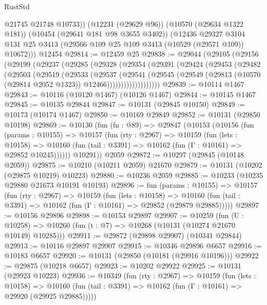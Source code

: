 \begin{lexlean}{RustStd}
\begin{coremodule}
          @21745
          @21748
          @10733))
      (@12231 (@29629 @96))
      (@10570 (@29634 @1322 @181))
      (@10454 (@29641 @181 @98 @3655 @3402))
      (@12436
        @29327
        @3104
        @131
        @25
        @3413
        (@29566 @109 @25 @109 @3413 (@10529 (@29571 @109)) @10672)))
    @12454
@29814 := @12459 @25
@29838 := @29044
    (@29105
      (@29156
        (@29199
          (@29237
            (@29285
              (@29328
                (@29354
                  (@29391
                    (@29424
                      (@29453
                        (@29482
                          (@29503
                            (@29519
                              (@29533
                                (@29537
                                  (@29541
                                    (@29545
                                      (@29549
                                        (@29813
                                          (@10570 (@29814 @2052 @1323))
                                          @12466)))))))))))))))))))
@29839 := @10114 @1467
@29843 := @10116 (@10120 @1467) (@10126 @1467)
@29844 := @10145 @1467
@29845 := @10135 @29844
@29847 := @10131 (@29845 @10150)
@29849 := @10173 (@10174 @1467)
@29850 := @10169 @29849
@29852 := @10131 (@29850 @10198)
@29869 := @10130
    (fun (fn : @89) =>
    @29847
      (@10153
        (@10156
          (fun (params : @10155) =>
          @10157
            (fun (rty : @2967) =>
            @10159
              (fun (lets : @10158) =>
              @10160 (fun (tail : @3391) => @10162 (fun (Γ : @10161) => @29852 @10245))))))
        @10291))
    @2059
@29872 := @10297 (@29845 (@10148 @2059))
@29875 := @10210 (@10211 @2059) @21670
@29879 := @10131 (@10202 (@29875 @10219) @10223)
@29880 := @10236 @2059
@29885 := @10233 (@10235 @29880 @21673 @10191 @10193)
@29896 := fun (params : @10155) =>
  @10157
    (fun (rty : @2967) =>
    @10159
      (fun (lets : @10158) =>
      @10160 (fun (tail : @3391) => @10162 (fun (Γ : @10161) => @29852 (@29879 @29885)))))
@29897 := @10156 @29896
@29898 := @10153 @29897
@29907 := @10259
    (fun (U : @10258) => @10260 (fun (t : @7) => @10268 (@10131 (@10274 @21670 @10149) @10285)))
@29911 := @29872 (@29898 @29907) (@10341 @29844)
@29913 := @10116 @29897 @29907
@29915 := @10346 @29896 @6657
@29916 := @10183 @6657
@29920 := @10131 (@29850 (@10181 (@29916 @10196)))
@29922 := @29875 (@10218 @6657)
@29923 := @10202 @29922
@29925 := @10131 (@29923 @10223)
@29936 := @10349
    (fun (rty : @2967) =>
    @10159
      (fun (lets : @10158) =>
      @10160 (fun (tail : @3391) => @10162 (fun (Γ : @10161) => @29920 (@29925 @29885)))))

\end{coremodule}
\end{lexlean}
